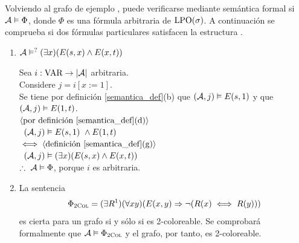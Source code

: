 Volviendo al grafo de ejemplo \A, puede verificarse mediante semántica 
formal si $\mathcal{A}\vDash\Phi$, donde $\Phi$
es una fórmula arbitraria de $\text{LPO}(\sigma)$. A continuación se comprueba si dos
fórmulas particulares satisfacen la estructura \A. 

\begin{enumerate}
\item $\mathcal{A}\vDash^?(\exists x)(E(s,x)\land E(x,t))$

Sea $i : \text{VAR} \rightarrow |\mathcal{A}|$ arbitraria.\\
Considere $j = i[x:=1]$.\\
Se tiene por definición \ref{semantica_def}(b) que $(\mathcal{A},j) \vDash E(s,1)$ y que $(\mathcal{A},j) \vDash E(1,t)$.\\
$\langle \text{por definición \ref{semantica_def}(d)} \rangle$\\
\mbox{\hspace{5mm} $(\mathcal{A},j) \vDash E(s,1)\ \land E(1,t)$}\\
$\iff \langle \text{definición \ref{semantica_def}(g)} \rangle$\\
\mbox{\hspace{5mm} $(\mathcal{A},j) \vDash (\exists x)(E(s,x) \land E(x,t))$}\\
$\therefore\ \mathcal{A} \vDash \Phi$, porque $i$ es arbitraria.

\item La sentencia
\[ \Phi_{\textsc{2Col}} = (\exists R^1)(\forall xy)(E(x,y)\Rightarrow \neg (R(x) \iff R(y))) \]
es cierta para un grafo si y sólo si es 2-coloreable. Se comprobará formalmente
que $\mathcal{A} \vDash \Phi_{\textsc{2Col}}$ y el grafo, por tanto, es 2-coloreable.


\end{enumerate}
